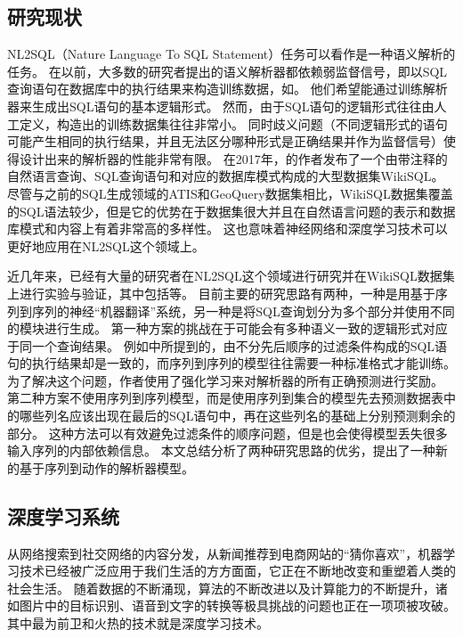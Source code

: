 \subsection{研究现状}

NL2SQL（Nature Language To SQL Statement）任务可以看作是一种语义解析的任务。
在以前，大多数的研究者提出的语义解析器都依赖弱监督信号，即以SQL查询语句在数据库中的执行结果来构造训练数据，如\cite{goldman2017weakly}。
他们希望能通过训练解析器来生成出SQL语句的基本逻辑形式。
然而，由于SQL语句的逻辑形式往往由人工定义，构造出的训练数据集往往非常小。
同时歧义问题（不同逻辑形式的语句可能产生相同的执行结果，并且无法区分哪种形式是正确结果并作为监督信号）使得设计出来的解析器的性能非常有限。
在2017年，\cite{zhong2017seq2sql}的作者发布了一个由带注释的自然语言查询、SQL查询语句和对应的数据库模式构成的大型数据集WikiSQL。
尽管与之前的SQL生成领域的ATIS和GeoQuery数据集相比，WikiSQL数据集覆盖的SQL语法较少，但是它的优势在于数据集很大并且在自然语言问题的表示和数据库模式和内容上有着非常高的多样性。
这也意味着神经网络和深度学习技术可以更好地应用在NL2SQL这个领域上。

近几年来，已经有大量的研究者在NL2SQL这个领域进行研究并在WikiSQL数据集上进行实验与验证，其中包括\cite{zhong2017seq2sql,dong2016language,xu2017sqlnet,yu2018typesql,wang2018pointing,huang2018natural,wang2018execution}等。
目前主要的研究思路有两种，一种是用基于序列到序列的神经“机器翻译”系统\cite{zhong2017seq2sql,dong2016language}，另一种是将SQL查询划分为多个部分并使用不同的模块进行生成\cite{xu2017sqlnet,yu2018typesql}。
第一种方案的挑战在于可能会有多种语义一致的逻辑形式对应于同一个查询结果。
例如\cite{zhong2017seq2sql}中所提到的，由不分先后顺序的过滤条件构成的SQL语句的执行结果却是一致的，而序列到序列的模型往往需要一种标准格式才能训练。
为了解决这个问题，作者使用了强化学习来对解析器的所有正确预测进行奖励。
第二种方案不使用序列到序列模型，而是使用序列到集合的模型先去预测数据表中的哪些列名应该出现在最后的SQL语句中，再在这些列名的基础上分别预测剩余的部分。
这种方法可以有效避免过滤条件的顺序问题，但是也会使得模型丢失很多输入序列的内部依赖信息。
本文总结分析了两种研究思路的优劣，提出了一种新的基于序列到动作的解析器模型。

\subsection{深度学习系统}


从网络搜索到社交网络的内容分发，从新闻推荐到电商网站的“猜你喜欢”，机器学习技术已经被广泛应用于我们生活的方方面面，它正在不断地改变和重塑着人类的社会生活。
随着数据的不断涌现，算法的不断改进以及计算能力的不断提升，诸如图片中的目标识别、语音到文字的转换等极具挑战的问题也正在一项项被攻破。
其中最为前卫和火热的技术就是深度学习技术。

